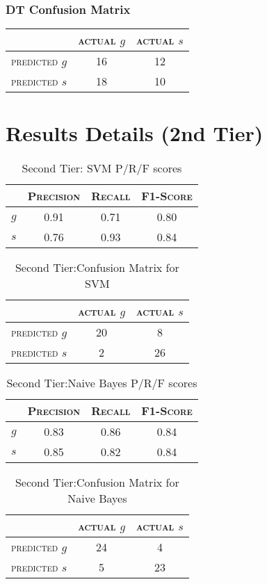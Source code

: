 \begin{multicols}{2}
\subsection{DT Confusion Matrix}
\begin{tabular}{ c | c  c }
	 & \textsc{actual $g$} & \textsc{actual $s$} \\
	\hline
	\textsc{predicted $g$} 	& 16 & 12 \\
	\textsc{predicted $s$}		& 18 & 10
\end{tabular}
\end{multicols}


\chapter{Results Details (2nd Tier)}

\begin{table}[h]
	\center
	\begin{tabular}{ c | c  c  c }
		& \textsc{Precision} & \textsc{Recall} & \textsc{F1-Score} \\
		\hline
		\textsc{$g$} 	& 0.91 & 0.71 & 0.80 \\
		\textsc{$s$}	& 0.76 & 0.93 & 0.84
	\end{tabular}
	\caption{Second Tier: SVM P/R/F scores}
\end{table}

\begin{table}[h]
	\center
	\begin{tabular}{ c | c  c }
		 & \textsc{actual $g$} & \textsc{actual $s$} \\
		\hline
		\textsc{predicted $g$} 	& 20 & 8 \\
		\textsc{predicted $s$}		& 2 & 26
	\end{tabular}
	\caption{Second Tier:Confusion Matrix for SVM}
\end{table}

\begin{table}[h]
	\center
	\begin{tabular}{ c | c  c  c }
		& \textsc{Precision} & \textsc{Recall} & \textsc{F1-Score} \\
		\hline
		\textsc{$g$} 	& 0.83 & 0.86 & 0.84 \\
		\textsc{$s$}	& 0.85 & 0.82 & 0.84
	\end{tabular}
	\caption{Second Tier:Naive Bayes P/R/F scores}
\end{table}

\begin{table}[h]
	\center
	\begin{tabular}{ c | c  c }
		 & \textsc{actual $g$} & \textsc{actual $s$} \\
		\hline
		\textsc{predicted $g$} 	& 24 & 4 \\
		\textsc{predicted $s$}		& 5 & 23
	\end{tabular}
	\caption{Second Tier:Confusion Matrix for Naive Bayes}
\end{table}

